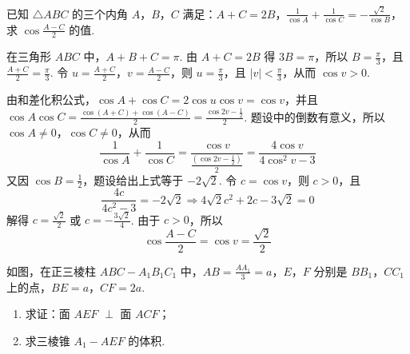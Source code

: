 \begin{problem}
已知 \(\triangle ABC\) 的三个内角 \(A\)，\(B\)，\(C\) 满足：\(A + C = 2B\)，\(\frac{1}{\cos A} + \frac{1}{\cos C} = -\frac{\sqrt{2}}{\cos B}\)，求 \(\cos \frac{A - C}{2}\) 的值.
\end{problem}

\begin{solution}
在三角形 \(ABC\) 中，\(A+B+C=\pi\). 由 \(A+C=2B\) 得 \(3B=\pi\)，所以 \(B=\frac{\pi}{3}\)，且 \(\frac{A+C}{2}=\frac{\pi}{3}\). 令 \(u=\frac{A+C}{2}\)，\(v=\frac{A-C}{2}\)，则 \(u=\frac{\pi}{3}\)，且 \(|v|<\frac{\pi}{3}\)，从而 \(\cos v>0\).

由和差化积公式，\(\cos A+\cos C=2\cos u\cos v=\cos v\)，并且 \(\cos A\cos C=\frac{\cos(A+C)+\cos(A-C)}{2}=\frac{\cos 2v-\frac{1}{2}}{2}\). 题设中的倒数有意义，所以 \(\cos A\ne0\)，\(\cos C\ne0\)，从而
\[
\frac{1}{\cos A}+\frac{1}{\cos C}=\frac{\cos v}{\frac{\left(\cos 2v-\frac{1}{2}\right)}{2}}=\frac{4\cos v}{4\cos^2v-3}
\]
又因 \(\cos B=\frac{1}{2}\)，题设给出上式等于 \(-2\sqrt{2}\). 令 \(c=\cos v\)，则 \(c>0\)，且
\[
\frac{4c}{4c^2-3}=-2\sqrt{2}\Longrightarrow 4\sqrt{2}c^2+2c-3\sqrt{2}=0
\]
解得 \(c=\frac{\sqrt{2}}{2}\) 或 \(c=-\frac{3\sqrt{2}}{4}\). 由于 \(c>0\)，所以
\[
\cos\frac{A-C}{2}=\cos v=\frac{\sqrt{2}}{2}
\]
\end{solution}

\begin{problem}
如图，在正三棱柱 \(ABC - A_{1}B_{1}C_{1}\) 中，\(AB = \frac{AA_{1}}{3} = a\)，\(E\)，\(F\) 分别是 \(BB_{1}\)，\(CC_{1}\) 上的点，\(BE = a\)，\(CF = 2a\).

\begin{enumerate}
\item 求证：面 \(AEF\) \(\perp\) 面 \(ACF\)；
\item 求三棱锥 \(A_{1} - AEF\) 的体积.
\end{enumerate}

\end{problem}

